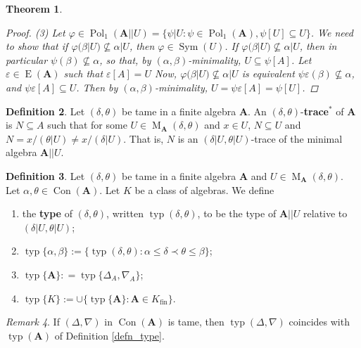 \documentclass{amsart}
\theoremstyle{plain}
\newtheorem{theorem}{Theorem}[section]
\theoremstyle{definition}
\newtheorem{definition}[theorem]{Definition}
\theoremstyle{remark}
\newtheorem{remark}[theorem]{Remark}
\def\phi{\varphi}
\def\epsilon{\varepsilon}
\DeclareMathOperator{\Con}{Con}
\DeclareMathOperator{\Pol}{Pol}
\DeclareMathOperator{\typ}{typ}
\DeclareMathOperator{\Sym}{Sym}
\DeclareMathOperator{\Id}{E}
\DeclareMathOperator{\M}{M}
\DeclareMathOperator{\fin}{fin}
\begin{document}
\begin{theorem}
\begin{proof}
        (3) Let $\phi \in \Pol_1(\mathbf{A}||U)=\{\psi|U : \psi \in \Pol_1(\mathbf{A}), \psi[U] \subseteq U\}$. 
        We need to show that if $\phi(\beta | U) \nsubseteq \alpha|U$, then $\phi \in \Sym(U)$. 
        If $\phi(\beta | U) \nsubseteq \alpha|U$, then in particular $\psi(\beta) \nsubseteq \alpha$, so that, by $(\alpha,\beta)$-minimality, $U \subseteq \psi[A]$. 
        Let $\epsilon \in \Id(\mathbf{A})$ such that $\epsilon[A]=U$
        Now, $\phi(\beta | U) \nsubseteq \alpha|U$ is equivalent $\psi \epsilon (\beta) \nsubseteq \alpha$, and $\psi \epsilon[A] \subseteq U$. 
        Then by $(\alpha, \beta)$-minimality, $U =\psi \epsilon[A] = \psi[U]$.  
    \end{proof}
\end{theorem}

\begin{definition}
    Let $(\delta, \theta)$ be tame in a finite algebra $\mathbf{A}$. 
    An $(\delta, \theta)$-\textbf{trace$^*$} of $\mathbf{A}$ is 
    $N \subseteq A$ such that for some $U \in \M_{\mathbf{A}}(\delta, \theta)$ and $x \in U$, $N\subseteq U$ and $N=x/(\theta|U) \neq x/(\delta|U)$. 
    That is, $N$ is an $(\delta|U, \theta|U)$-trace of the minimal algebra $\mathbf{A}||U$. 
\end{definition}

\begin{definition}
    Let $(\delta, \theta)$ be tame in a finite algebra $\mathbf{A}$ and $U \in \M_{\mathbf{A}}(\delta, \theta)$.
    Let $\alpha, \theta \in \Con(\mathbf{A})$. 
    Let $K$ be a class of algebras. 
    We define 
    \begin{enumerate}
        \item the \textbf{type} of $(\delta, \theta)$, written $\typ(\delta, \theta)$, to be the type of
        $\mathbf{A}||U$ relative to $(\delta|U, \theta|U)$;
        \item $\typ\{\alpha, \beta\} :=\{ \typ(\delta, \theta) : \alpha \le \delta \prec \theta \le \beta\}$;
        \item $\typ\{\mathbf{A}\}: =\typ\{\Delta_A, \nabla_A\}$; 
        \item $\typ\{K\}:=\cup\{\typ\{\mathbf{A}\} : \mathbf{A} \in K_{\fin}\}$. 
    \end{enumerate}
\end{definition}

\begin{remark}
    If $(\Delta, \nabla)$ in $\Con(\mathbf{A})$ is tame, then $\typ(\Delta, \nabla)$ coincides with $\typ(\mathbf{A})$ of Definition \ref{defn_type}. 
\end{remark}
\end{document}
